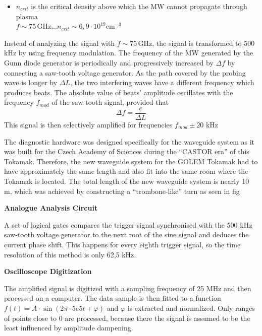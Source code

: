 \documentclass[portrait,final,a0paper]{baposter}
\begin{document}
\begin{poster}
{\begin{multicols}{2}
\begin{itemize}
\item $n_{crit}$ is the critical density above which the MW cannot propagate through plasma\\ $f \sim 75 \,\text{GHz} \ldots n_{crit} \sim 6,9 \cdot 10^{19} \text{cm}^{-3}$
\end{itemize}
\end{multicols}
 }
 {
 Instead of analyzing the signal with $f \sim 75 \,\text{GHz}$, the signal is transformed to 500 kHz by using frequency modulation. The frequency of the MW generated by the Gunn diode generator is periodically and progressively increased by $\Delta f$ by connecting a saw-tooth voltage generator. As the path covered by the probing wave is longer by $\Delta L$, the two interfering waves have a different frequency which produces beats. The absolute value of beats' amplitude oscillates with the frequency $f_{mod}$ of the saw-tooth signal, provided that\begin{equation}
     \Delta f = \frac{c}{\Delta L} 
     \label{eq:mod}
 \end{equation}
 This signal is then selectively amplified for frequencies $ f_{mod} \pm 20$ kHz
 }



{
 The diagnostic hardware was designed specifically for the waveguide system as it was built for the Czech Academy of Sciences during the ``CASTOR era'' of this Tokamak. Therefore, the new waveguide system for the GOLEM Tokamak had to have approximately the same length and also fit into the same room where the Tokamak is located.
The total length of the new waveguide system is nearly 10 m, which was achieved by constructing a ``trombone-like'' turn as seen in fig %
}

 {
\textbf{Analogue Analysis Circuit}
 
 A set of logical gates compares the trigger signal synchronised with the 500 kHz saw-tooth voltage generator to the next root of the sine signal and deduces the current phase shift. This happens for every eighth trigger signal, so the time resolution of this method is only 62,5 kHz.

 \textbf{Oscilloscope Digitization}

The amplified signal is digitized with a sampling frequency of 25 MHz and then processed on a computer. The data sample is then fitted to a function $f(t)=A \cdot \sin (2\pi\cdot 5e5 t + \varphi)$ and $\varphi$ is extracted and normalized. Only ranges of points close to $0$ are processed, because there the signal is assumed to be the least influenced by amplitude dampening.
 }


\end{poster}
\end{document}
